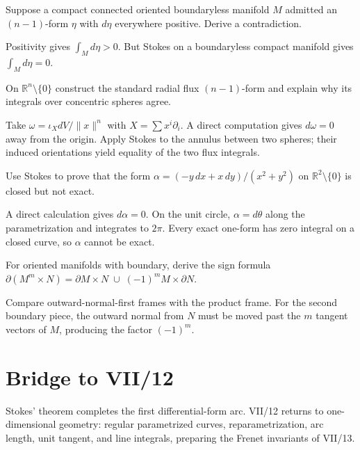 \begin{problem}\label{prob:vii11-ch02}
Suppose a compact connected oriented boundaryless manifold $M$ admitted an $(n-1)$-form $\eta$ with $d\eta$ everywhere positive. Derive a contradiction.
\end{problem}
\begin{solution}
Positivity gives $\int_Md\eta>0$. But Stokes on a boundaryless compact manifold gives $\int_Md\eta=0$.
\end{solution}

\begin{problem}\label{prob:vii11-ch03}
On $\mathbb R^n\setminus\{0\}$ construct the standard radial flux $(n-1)$-form and explain why its integrals over concentric spheres agree.
\end{problem}
\begin{solution}
Take $\omega=\iota_XdV/\|x\|^n$ with $X=\sum x^i\partial_i$. A direct computation gives $d\omega=0$ away from the origin. Apply Stokes to the annulus between two spheres; their induced orientations yield equality of the two flux integrals.
\end{solution}

\begin{problem}\label{prob:vii11-ch04}
Use Stokes to prove that the form $\alpha=(-y\,dx+x\,dy)/(x^2+y^2)$ on $\mathbb R^2\setminus\{0\}$ is closed but not exact.
\end{problem}
\begin{solution}
A direct calculation gives $d\alpha=0$. On the unit circle, $\alpha=d\theta$ along the parametrization and integrates to $2\pi$. Every exact one-form has zero integral on a closed curve, so $\alpha$ cannot be exact.
\end{solution}

\begin{problem}\label{prob:vii11-ch05}
For oriented manifolds with boundary, derive the sign formula $\partial(M^m\times N)=\partial M\times N\;\cup\;(-1)^m M\times\partial N$.
\end{problem}
\begin{solution}
Compare outward-normal-first frames with the product frame. For the second boundary piece, the outward normal from $N$ must be moved past the $m$ tangent vectors of $M$, producing the factor $(-1)^m$.
\end{solution}

\section*{Bridge to VII/12}
Stokes' theorem completes the first differential-form arc. VII/12 returns to one-dimensional geometry: regular parametrized curves, reparametrization, arc length, unit tangent, and line integrals, preparing the Frenet invariants of VII/13.
